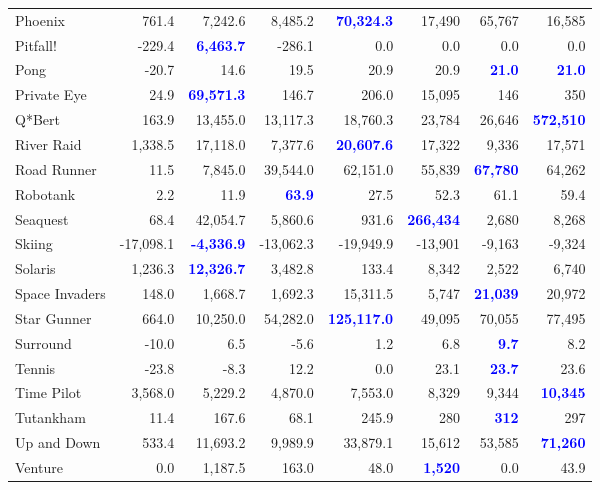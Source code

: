 \documentclass[letterpaper]{article}
\begin{document}
\begin{figure*}
\begin{tabular}{ l | r|r|r|r|r|r| r }
Phoenix & 761.4 & 7,242.6 & 8,485.2 & \textbf{\textcolor{blue}{70,324.3}} & 17,490 & 65,767 & 16,585 \\
Pitfall! & -229.4 & \textbf{\textcolor{blue}{6,463.7}} & -286.1 & 0.0 & 0.0 & 0.0 & 0.0 \\
Pong & -20.7 & 14.6 & 19.5 & 20.9 & 20.9 & \textbf{\textcolor{blue}{21.0}} & \textbf{\textcolor{blue}{21.0}} \\
Private Eye & 24.9 & \textbf{\textcolor{blue}{69,571.3}} & 146.7 & 206.0 & 15,095 & 146 & 350 \\
Q*Bert & 163.9 & 13,455.0 & 13,117.3 & 18,760.3 & 23,784 & 26,646 & \textbf{\textcolor{blue}{572,510}} \\
River Raid & 1,338.5 & 17,118.0 & 7,377.6 & \textbf{\textcolor{blue}{20,607.6}} & 17,322 & 9,336 & 17,571 \\
Road Runner & 11.5 & 7,845.0 & 39,544.0 & 62,151.0 & 55,839 & \textbf{\textcolor{blue}{67,780}} & 64,262 \\
Robotank & 2.2 & 11.9 & \textbf{\textcolor{blue}{63.9}} & 27.5 & 52.3 & 61.1 & 59.4 \\
Seaquest & 68.4 & 42,054.7 & 5,860.6 & 931.6 & \textbf{\textcolor{blue}{266,434}} & 2,680 & 8,268 \\
Skiing & -17,098.1 & \textbf{\textcolor{blue}{-4,336.9}} & -13,062.3 & -19,949.9 & -13,901 & -9,163 & -9,324 \\
Solaris & 1,236.3 & \textbf{\textcolor{blue}{12,326.7}} & 3,482.8 & 133.4 & 8,342 & 2,522 & 6,740 \\
Space Invaders & 148.0 & 1,668.7 & 1,692.3 & 15,311.5 & 5,747 & \textbf{\textcolor{blue}{21,039}} & 20,972 \\
Star Gunner & 664.0 & 10,250.0 & 54,282.0 & \textbf{\textcolor{blue}{125,117.0}} & 49,095 & 70,055 & 77,495 \\
Surround & -10.0 & 6.5 & -5.6 & 1.2 & 6.8 & \textbf{\textcolor{blue}{9.7}} & 8.2 \\
Tennis & -23.8 & -8.3 & 12.2 & 0.0 & 23.1 & \textbf{\textcolor{blue}{23.7}} & 23.6 \\
Time Pilot & 3,568.0 & 5,229.2 & 4,870.0 & 7,553.0 & 8,329 & 9,344 & \textbf{\textcolor{blue}{10,345}} \\
Tutankham & 11.4 & 167.6 & 68.1 & 245.9 & 280 & \textbf{\textcolor{blue}{312}} & 297 \\
Up and Down & 533.4 & 11,693.2 & 9,989.9 & 33,879.1 & 15,612 & 53,585 & \textbf{\textcolor{blue}{71,260}} \\
Venture & 0.0 & 1,187.5 & 163.0 & 48.0 & \textbf{\textcolor{blue}{1,520}} & 0.0 & 43.9 \\

\end{tabular}
\end{figure*}
\end{document}
